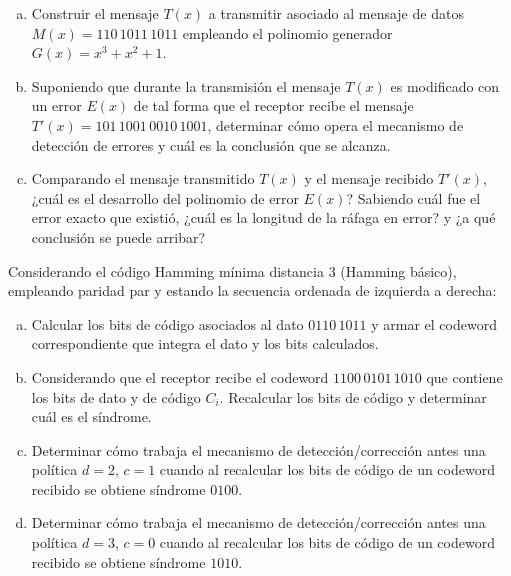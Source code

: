 \documentclass[12pt,a4paper]{article}
\begin{document}
\begin{enumerate}[a)]
	\item Construir el mensaje $T(x)$ a transmitir asociado al mensaje de datos
	$M(x) = 110\,1011\,1011$ empleando el polinomio generador $G(x) = x^3 + x^2 + 1$.

	\item Suponiendo que durante la transmisión el mensaje $T(x)$ es modificado con un error $E(x)$ de tal forma que el receptor recibe el mensaje $T'(x) = 101\,1001\,0010\,1001$, determinar cómo opera el mecanismo de detección de errores y cuál es la conclusión que se alcanza.

	\item Comparando el mensaje transmitido $T(x)$ y el mensaje recibido $T'(x)$, ¿cuál es el desarrollo del polinomio de error $E(x)$? Sabiendo cuál fue el error exacto que existió, ¿cuál es la longitud de la ráfaga en error? y ¿a qué conclusión se puede arribar?
\end{enumerate}


 Considerando el código Hamming mínima distancia 3 (Hamming básico), empleando paridad par y estando la secuencia ordenada de izquierda a derecha:

\begin{enumerate}[a)]

	\item Calcular los bits de código asociados al dato $0110\,1011$ y armar el codeword correspondiente que integra el dato y los bits calculados. 

	\item Considerando que el receptor recibe el codeword $1100\,0101\,1010$ que contiene los bits de dato y de código $C_i$. Recalcular los bits de código y determinar cuál es el síndrome.

	\item Determinar cómo trabaja el mecanismo de detección/corrección antes una política $d=2$, $c=1$ cuando al recalcular los bits de código de un codeword recibido se obtiene síndrome $0100$.

	\item Determinar cómo trabaja el mecanismo de detección/corrección antes una política $d=3$, $c=0$ cuando al recalcular los bits de código de un codeword recibido se obtiene síndrome $1010$.
\end{enumerate}
\end{document}
